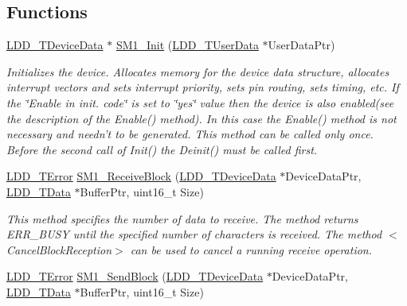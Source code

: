 \subsection*{Functions}
\begin{DoxyCompactItemize}
\item 
\hyperlink{group___p_e___types__module_gac5cf1362f1f0e3a2ce71b1bf2276d091}{L\-D\-D\-\_\-\-T\-Device\-Data} $\ast$ \hyperlink{group___s_m1__module_gad3b10564a4ed41d623dc3c2e47c47db5}{S\-M1\-\_\-\-Init} (\hyperlink{group___p_e___types__module_ga0b66a73f87238a782318aa0be7578e35}{L\-D\-D\-\_\-\-T\-User\-Data} $\ast$User\-Data\-Ptr)
\begin{DoxyCompactList}\small\item\em Initializes the device. Allocates memory for the device data structure, allocates interrupt vectors and sets interrupt priority, sets pin routing, sets timing, etc. If the \char`\"{}\-Enable in init. code\char`\"{} is set to \char`\"{}yes\char`\"{} value then the device is also enabled(see the description of the Enable() method). In this case the Enable() method is not necessary and needn't to be generated. This method can be called only once. Before the second call of Init() the Deinit() must be called first. \end{DoxyCompactList}\item 
\hyperlink{group___p_e___types__module_ga24c2b045fd04e79e85f261ce4df35588}{L\-D\-D\-\_\-\-T\-Error} \hyperlink{group___s_m1__module_ga667ca934fe6d893b7a415609216a34b7}{S\-M1\-\_\-\-Receive\-Block} (\hyperlink{group___p_e___types__module_gac5cf1362f1f0e3a2ce71b1bf2276d091}{L\-D\-D\-\_\-\-T\-Device\-Data} $\ast$Device\-Data\-Ptr, \hyperlink{group___p_e___types__module_gade8ef9401405bd941b6da738b807f980}{L\-D\-D\-\_\-\-T\-Data} $\ast$Buffer\-Ptr, uint16\-\_\-t Size)
\begin{DoxyCompactList}\small\item\em This method specifies the number of data to receive. The method returns E\-R\-R\-\_\-\-B\-U\-S\-Y until the specified number of characters is received. The method $<$\-Cancel\-Block\-Reception$>$ can be used to cancel a running receive operation. \end{DoxyCompactList}\item 
\hyperlink{group___p_e___types__module_ga24c2b045fd04e79e85f261ce4df35588}{L\-D\-D\-\_\-\-T\-Error} \hyperlink{group___s_m1__module_ga939d367011f517b484f0f9e3f3861195}{S\-M1\-\_\-\-Send\-Block} (\hyperlink{group___p_e___types__module_gac5cf1362f1f0e3a2ce71b1bf2276d091}{L\-D\-D\-\_\-\-T\-Device\-Data} $\ast$Device\-Data\-Ptr, \hyperlink{group___p_e___types__module_gade8ef9401405bd941b6da738b807f980}{L\-D\-D\-\_\-\-T\-Data} $\ast$Buffer\-Ptr, uint16\-\_\-t Size)

\end{DoxyCompactItemize}
